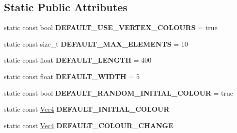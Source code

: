 \subsection*{Static Public Attributes}
\begin{DoxyCompactItemize}
\item 
\mbox{\label{classPURibbonTrailRender_a67949c16b7be434fcac501f6dee19ac3}} 
static const bool {\bfseries D\+E\+F\+A\+U\+L\+T\+\_\+\+U\+S\+E\+\_\+\+V\+E\+R\+T\+E\+X\+\_\+\+C\+O\+L\+O\+U\+RS} = true
\item 
\mbox{\label{classPURibbonTrailRender_a9da99be9d7e1886d3931c66de1bf91e8}} 
static const size\+\_\+t {\bfseries D\+E\+F\+A\+U\+L\+T\+\_\+\+M\+A\+X\+\_\+\+E\+L\+E\+M\+E\+N\+TS} = 10
\item 
\mbox{\label{classPURibbonTrailRender_a481f621854d16b5a74377018bd394b95}} 
static const float {\bfseries D\+E\+F\+A\+U\+L\+T\+\_\+\+L\+E\+N\+G\+TH} = 400
\item 
\mbox{\label{classPURibbonTrailRender_a620d758f626d4b2a8d8c72ca1db1491b}} 
static const float {\bfseries D\+E\+F\+A\+U\+L\+T\+\_\+\+W\+I\+D\+TH} = 5
\item 
\mbox{\label{classPURibbonTrailRender_ab19b915ce7a044af1b3663ea86325973}} 
static const bool {\bfseries D\+E\+F\+A\+U\+L\+T\+\_\+\+R\+A\+N\+D\+O\+M\+\_\+\+I\+N\+I\+T\+I\+A\+L\+\_\+\+C\+O\+L\+O\+UR} = true
\item 
\mbox{\label{classPURibbonTrailRender_ad095b866a95077697edf34f11197ad26}} 
static const \hyperlink{classVec4}{Vec4} {\bfseries D\+E\+F\+A\+U\+L\+T\+\_\+\+I\+N\+I\+T\+I\+A\+L\+\_\+\+C\+O\+L\+O\+UR}
\item 
\mbox{\label{classPURibbonTrailRender_a0da3febd5f80049cdc176ff32a68a972}} 
static const \hyperlink{classVec4}{Vec4} {\bfseries D\+E\+F\+A\+U\+L\+T\+\_\+\+C\+O\+L\+O\+U\+R\+\_\+\+C\+H\+A\+N\+GE}
\end{DoxyCompactItemize}
